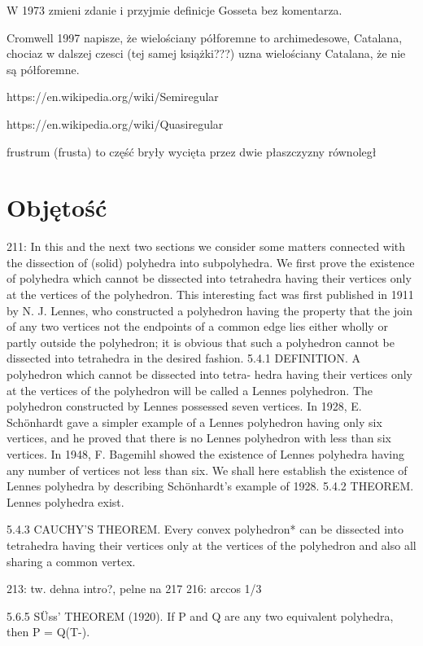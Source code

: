 W 1973 zmieni zdanie i przyjmie definicje Gosseta bez komentarza.

Cromwell 1997 napisze, że wielościany półforemne to archimedesowe, Catalana, chociaz w dalszej czesci (tej samej książki???) uzna wielościany Catalana, że nie są półforemne.

https://en.wikipedia.org/wiki/Semiregular%

https://en.wikipedia.org/wiki/Quasiregular%

frustrum (frusta) to część bryły wycięta przez dwie płaszczyzny równoległ


%

\section{Objętość}

211: 
In this and the next two sections we consider some matters connected with the dissection of (solid) polyhedra into subpolyhedra. We first prove the existence of polyhedra which cannot be dissected into tetrahedra having their vertices only at the vertices of the polyhedron. This interesting fact was first published in 1911 by N. J. Lennes, who constructed a polyhedron having the property that the join of any two vertices not the endpoints of a common edge lies either wholly or partly outside the polyhedron; it is obvious that such a polyhedron cannot be dissected into tetrahedra in the desired fashion. 5.4.1 DEFINITION. A polyhedron which cannot be dissected into tetra- hedra having their vertices only at the vertices of the polyhedron will be called a Lennes polyhedron. The polyhedron constructed by Lennes possessed seven vertices. In 1928, E. Schönhardt gave a simpler example of a Lennes polyhedron having only six vertices, and he proved that there is no Lennes polyhedron with less than six vertices. In 1948, F. Bagemihl showed the existence of Lennes polyhedra having any number of vertices not less than six. We shall here establish the existence of Lennes polyhedra by describing Schönhardt's example of 1928. 5.4.2 THEOREM. Lennes polyhedra exist.

5.4.3 CAUCHY'S THEOREM. Every convex polyhedron* can be dissected into
tetrahedra having their vertices only at the vertices of the polyhedron and also
all sharing a common vertex.

213: tw. dehna intro?, pelne na 217
216: arccos 1/3

5.6.5 SÜss' THEOREM (1920). If P and Q are any two equivalent polyhedra,
then P = Q(T-).